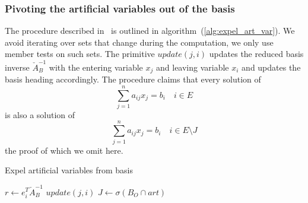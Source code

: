 \documentclass[a4paper]{article}
\begin{document}
\subsubsection{Pivoting the artificial variables out of the basis}
The procedure described in~\cite{Chvatal} is outlined in
algorithm~(\ref{alg:expel_art_var}). We avoid iterating
over sets that change during the computation, we only use member tests on such
sets. The primitive $update(j,i)$
updates the reduced basis inverse $\check{A}_{B}^{-1}$ with the entering
variable $x_{j}$ and leaving variable $x_{i}$ and updates the basis heading
accordingly. The procedure claims that every solution of 
\begin{equation}
\sum_{j=1}^{n}a_{ij}x_{j}=b_{i} \quad i \in E
\end{equation}
is also a solution of
\begin{equation}
\sum_{j=1}^{n}a_{ij}x_{j}=b_{i} \quad i \in E \setminus J
\end{equation}
the proof of which we omit here.
\begin{algorithm}
\caption{Expel artificial variables from basis}
\label{alg:expel_art_var}
\begin{algorithmic}[0]
        \State $r \gets e_{i}^{T}\check{A}_{B}^{-1}$
		    \State $update(j,i)$
                \EndIf
	    \EndIf
        \EndFor
    \EndIf
\EndFor
\State $J \gets \sigma(B_{O} \cap art)$
\end{algorithmic}
\end{algorithm}
\end{document}
